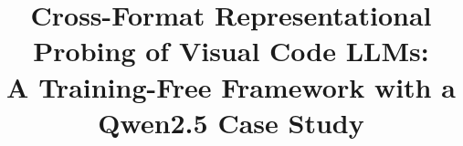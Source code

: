 

\title{Cross-Format Representational Probing of Visual Code LLMs:\\A Training-Free Framework with a Qwen2.5 Case Study}

\maketitle


